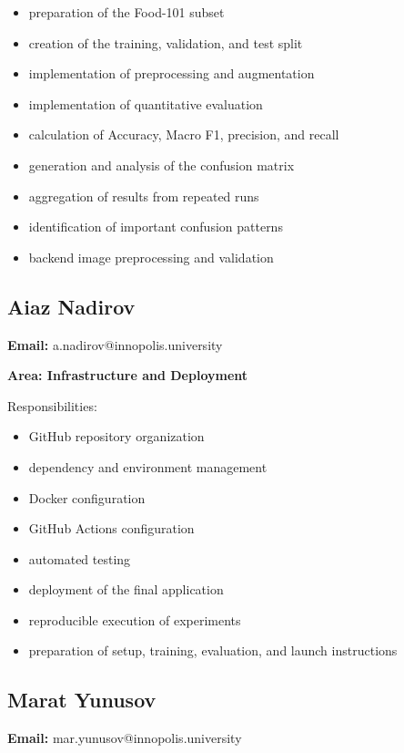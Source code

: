 \documentclass[11pt,a4paper]{article}
\begin{document}
\begin{itemize}
    \item preparation of the Food-101 subset
    \item creation of the training, validation, and test split
    \item implementation of preprocessing and augmentation
    \item implementation of quantitative evaluation
    \item calculation of Accuracy, Macro F1, precision, and recall
    \item generation and analysis of the confusion matrix
    \item aggregation of results from repeated runs
    \item identification of important confusion patterns
    \item backend image preprocessing and validation
\end{itemize}

\subsection{Aiaz Nadirov}

\textbf{Email:} a.nadirov@innopolis.university

\textbf{Area: Infrastructure and Deployment}

Responsibilities:

\begin{itemize}
    \item GitHub repository organization
    \item dependency and environment management
    \item Docker configuration
    \item GitHub Actions configuration
    \item automated testing
    \item deployment of the final application
    \item reproducible execution of experiments
    \item preparation of setup, training, evaluation, and launch instructions
\end{itemize}

\subsection{Marat Yunusov}

\textbf{Email:} mar.yunusov@innopolis.university
\end{document}
